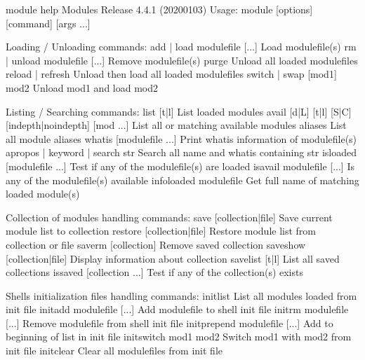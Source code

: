 \documentclass[a4paper,11pt,english]{sphinxmanual}
\begin{document}
\begin{sphinxVerbatim}[commandchars=\\\{\}]
\PYGZdl{}\PYGZgt{} module \PYGZhy{}\PYGZhy{}help
Modules Release 4.4.1 (2020\PYGZhy{}01\PYGZhy{}03)
Usage: module [options] [command] [args ...]

Loading / Unloading commands:
  add | load      modulefile [...]  Load modulefile(s)
  rm | unload     modulefile [...]  Remove modulefile(s)
  purge                             Unload all loaded modulefiles
  reload | refresh                  Unload then load all loaded modulefiles
  switch | swap   [mod1] mod2       Unload mod1 and load mod2

Listing / Searching commands:
  list            [\PYGZhy{}t|\PYGZhy{}l]           List loaded modules
  avail   [\PYGZhy{}d|\PYGZhy{}L] [\PYGZhy{}t|\PYGZhy{}l] [\PYGZhy{}S|\PYGZhy{}C] [\PYGZhy{}\PYGZhy{}indepth|\PYGZhy{}\PYGZhy{}no\PYGZhy{}indepth] [mod ...]
                                    List all or matching available modules
  aliases                           List all module aliases
  whatis          [modulefile ...]  Print whatis information of modulefile(s)
  apropos | keyword | search  str   Search all name and whatis containing str
  is\PYGZhy{}loaded       [modulefile ...]  Test if any of the modulefile(s) are loaded
  is\PYGZhy{}avail        modulefile [...]  Is any of the modulefile(s) available
  info\PYGZhy{}loaded     modulefile        Get full name of matching loaded module(s)

Collection of modules handling commands:
  save            [collection|file] Save current module list to collection
  restore         [collection|file] Restore module list from collection or file
  saverm          [collection]      Remove saved collection
  saveshow        [collection|file] Display information about collection
  savelist        [\PYGZhy{}t|\PYGZhy{}l]           List all saved collections
  is\PYGZhy{}saved        [collection ...]  Test if any of the collection(s) exists

Shell\PYGZsq{}s initialization files handling commands:
  initlist                          List all modules loaded from init file
  initadd         modulefile [...]  Add modulefile to shell init file
  initrm          modulefile [...]  Remove modulefile from shell init file
  initprepend     modulefile [...]  Add to beginning of list in init file
  initswitch      mod1 mod2         Switch mod1 with mod2 from init file
  initclear                         Clear all modulefiles from init file


\end{sphinxVerbatim}
\end{document}
